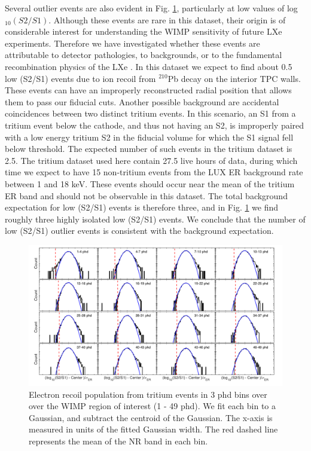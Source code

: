 Several outlier events are also evident in Fig. \ref{fig:ER-Gauss}, particularly at low values of log$_{10}(S2/S1)$. Although these events are rare in this dataset, their origin is of considerable interest for understanding the WIMP sensitivity of future LXe experiments.  Therefore we have investigated whether these events are attributable to detector pathologies, to backgrounds, or to the fundamental recombination physics of the LXe . In this dataset we expect to find about 0.5 low (S2/S1) events due to ion recoil from $^{210}$Pb decay on the interior TPC walls. These events can have an improperly reconstructed radial position that allows them to pass our fiducial cuts.  Another possible background are accidental coincidences between two distinct tritium events. In this scenario, an S1 from a tritium event below the cathode, and thus not having an S2, is improperly paired with a low energy tritium S2 in the fiducial volume for which the S1 signal fell below threshold. The expected number of such events in the tritium dataset is 2.5. The tritium dataset used here contain 27.5 live hours of data, during which time we expect to have 15 non-tritium events from the LUX ER background rate between 1 and 18 keV. These events should occur near the mean of the tritium ER band and should not be observable in this dataset. The total background expectation for low (S2/S1) events is therefore three, and in Fig. \ref{fig:ER-Gauss} we find roughly three highly isolated low (S2/S1) events. We conclude that the number of low (S2/S1) outlier events is consistent with the background expectation.

\onecolumngrid
\break
\begin{figure}
\includegraphics[width=140mm]{fig/Gaussianity/GaussER_all.png}
\caption{Electron recoil population from tritium events in 3 phd bins over over the WIMP region of interest (1 - 49 phd). We fit each bin to a Gaussian, and subtract the centroid of the Gaussian. The x-axis is measured in units of the fitted Gaussian width. The red dashed line represents the mean of the NR band in each bin. }
\label{fig:ER-Gauss}
\end{figure}
\twocolumngrid

